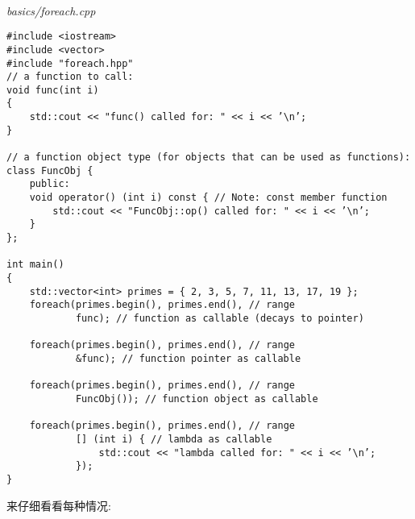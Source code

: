 \hspace*{\fill} \\ %
\noindent
\textit{basics/foreach.cpp}
\begin{lstlisting}[style=styleCXX]
#include <iostream>
#include <vector>
#include "foreach.hpp"
// a function to call:
void func(int i)
{
	std::cout << "func() called for: " << i << ’\n’;
}

// a function object type (for objects that can be used as functions):
class FuncObj {
	public:
	void operator() (int i) const { // Note: const member function
		std::cout << "FuncObj::op() called for: " << i << ’\n’;
	}
};

int main()
{
	std::vector<int> primes = { 2, 3, 5, 7, 11, 13, 17, 19 };
	foreach(primes.begin(), primes.end(), // range
			func); // function as callable (decays to pointer)

	foreach(primes.begin(), primes.end(), // range
			&func); // function pointer as callable

	foreach(primes.begin(), primes.end(), // range
			FuncObj()); // function object as callable

	foreach(primes.begin(), primes.end(), // range
			[] (int i) { // lambda as callable
				std::cout << "lambda called for: " << i << ’\n’;
			});
}
\end{lstlisting}

来仔细看看每种情况:

